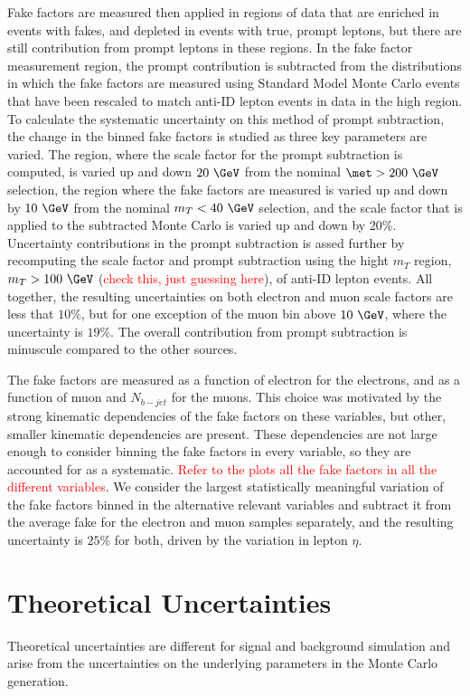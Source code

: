 Fake factors are measured then applied in regions of data that are enriched in events with fakes, and depleted in events with true, prompt leptons, but there are still contribution from prompt leptons in these regions.  In the fake factor measurement region, the prompt contribution is subtracted from the distributions in which the fake factors are measured using Standard Model Monte Carlo events that have been rescaled to match anti-ID lepton events in data in the high \met region.  To calculate the systematic uncertainty on this method of prompt subtraction, the change in the binned fake factors is studied as three key parameters are varied.  The \met region, where the scale factor for the prompt subtraction is computed, is varied up and down $20~\GeV$ from the nominal $\met>200~\GeV$ selection, the region where the fake factors are measured is varied up and down by $10~\GeV$ from the nominal $m_T<40~\GeV$ selection, and the scale factor that is applied to the subtracted Monte Carlo is varied up and down by $20\%$.  Uncertainty contributions in the prompt subtraction is assed further by recomputing the scale factor and prompt subtraction using the hight $m_T$ region, $m_T>100~\GeV$ (\textcolor{red}{check this, just guessing here}), of anti-ID lepton events.  All together, the resulting uncertainties on both electron and muon scale factors are less that $10\%$, but for one exception of the muon \pt bin above $10~\GeV$, where the uncertainty is $19\%$.  The overall contribution from prompt subtraction is minuscule compared to the other sources.

The fake factors are measured as a function of electron \pt for the electrons, and as a function of muon \pt and $N_{b-jet}$ for the muons.  This choice was motivated by the strong kinematic dependencies of the fake factors on these variables, but other, smaller kinematic dependencies are present.  These dependencies are not large enough to consider binning the fake factors in every variable, so they are accounted for as a systematic.  \textcolor{red}{Refer to the plots all the fake factors in all the different variables}.  We consider the largest statistically meaningful variation of the fake factors binned in the alternative relevant variables and subtract it from the average fake for the electron and muon samples separately, and the resulting uncertainty is $25\%$ for both, driven by the variation in lepton $\eta$.

\section{Theoretical Uncertainties}
Theoretical uncertainties are different for signal and background simulation and arise from the uncertainties on the underlying parameters in the Monte Carlo generation.
\label{sec:sys:thy}

